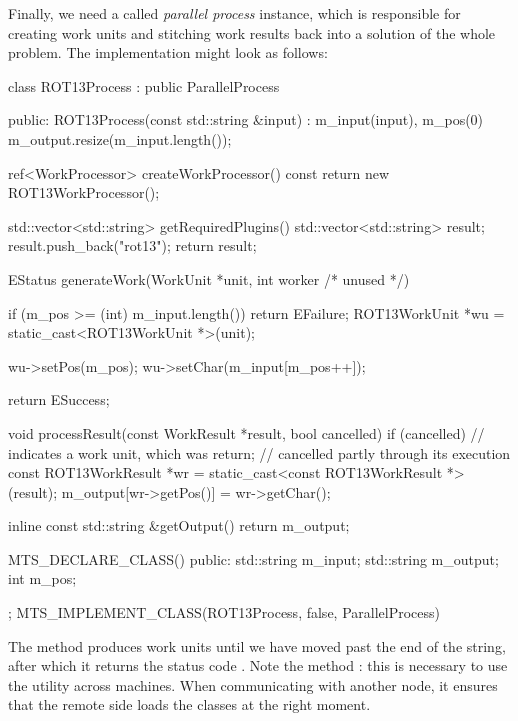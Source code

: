Finally, we need a called \emph{parallel process}
instance, which is responsible for creating work units and stitching
work results back into a solution of the whole problem. The 
implementation might look as follows:
\begin{cpp}
class ROT13Process : public ParallelProcess {
public:
	ROT13Process(const std::string &input) : m_input(input), m_pos(0) {
		m_output.resize(m_input.length());
	}

	ref<WorkProcessor> createWorkProcessor() const {
		return new ROT13WorkProcessor();
	}

	std::vector<std::string> getRequiredPlugins() {
		std::vector<std::string> result;
		result.push_back("rot13");
		return result;
	}

	EStatus generateWork(WorkUnit *unit, int worker /* unused */) {
		if (m_pos >= (int) m_input.length())
			return EFailure;
		ROT13WorkUnit *wu = static_cast<ROT13WorkUnit *>(unit);

		wu->setPos(m_pos);
		wu->setChar(m_input[m_pos++]);

		return ESuccess;
	}

	void processResult(const WorkResult *result, bool cancelled) {
		if (cancelled) // indicates a work unit, which was 
			return;    // cancelled partly through its execution
		const ROT13WorkResult *wr = 
			static_cast<const ROT13WorkResult *>(result);
		m_output[wr->getPos()] = wr->getChar();
	}

	inline const std::string &getOutput() {
		return m_output;
	}

	MTS_DECLARE_CLASS()
public:
	std::string m_input;
	std::string m_output;
	int m_pos;
};
MTS_IMPLEMENT_CLASS(ROT13Process, false, ParallelProcess)
\end{cpp}
The  method produces work units until we have moved past
the end of the string, after which it returns the status code .
Note the method : this is necessary to use 
the utility across
machines. When communicating with another node, it ensures that the remote side
loads the  classes at the right moment.


